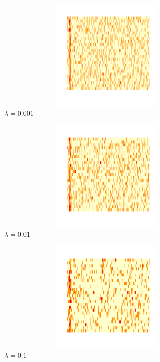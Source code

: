 \documentclass[12pt,twoside]{reedthesis}
\theoremstyle{definition}
\theoremstyle{definition}
\theoremstyle{remark}
\begin{document}
  \begin{figure}
  
  {\centering \includegraphics[width=400px,height=200px]{figure/ancestry_heatmap_lambda_0001} 
  
  }
  
  \caption{$\lambda = 0.001$}\label{fig:lambda0001}
  \end{figure}\begin{figure}
  
  {\centering \includegraphics[width=400px,height=200px]{figure/ancestry_heatmap_lambda_001} 
  
  }
  
  \caption{$\lambda = 0.01$}\label{fig:lambda001}
  \end{figure}\begin{figure}
  
  {\centering \includegraphics[width=400px,height=200px]{figure/ancestry_heatmap_lambda_01} 
  
  }
  
  \caption{$\lambda = 0.1$}\label{fig:lambda01}
  \end{figure}
  
\end{document}
